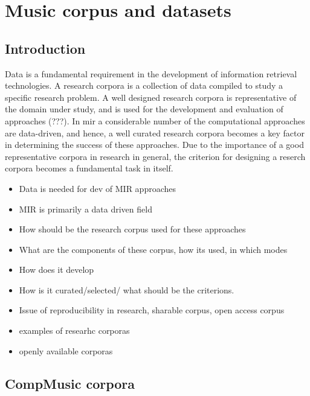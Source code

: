 
\chapter{Music corpus and datasets}\label{chap:datasets}

\section{Introduction}
\label{sec:corpus_intro}

Data is a fundamental requirement in the development of information retrieval technologies. A research corpora is a collection of data compiled to study a specific research problem. A well designed research corpora is representative of the domain under study, and is used for the development and evaluation of approaches (???). In \gls{mir} a considerable number of the computational approaches are data-driven, and hence, a well curated research corpora becomes a key factor in determining the success of these approaches. Due to the importance of a good representative corpora in research in general, the criterion for designing a reserch corpora becomes a fundamental task in itself.

 


\begin{itemize}
	\item Data is needed for dev of MIR approaches
	\item MIR is primarily a data driven field
	\item How should be the research corpus used for these approaches
	\item What are the components of these corpus, how its used, in which modes
	\item How does it develop
	\item How is it curated/selected/ what should be the criterions. 
	\item Issue of reproducibility in research, sharable corpus, open access corpus
	\item examples of researhc corporas 
	\item openly available corporas
	
\end{itemize}


\section{CompMusic corpora}

